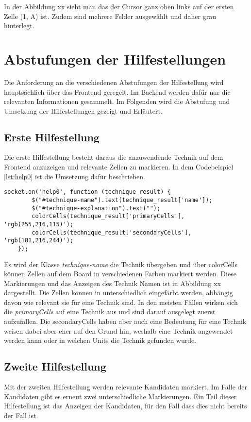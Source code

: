 In der Abbildung xx sieht man das der Cursor ganz oben links auf der ersten Zelle (1, A) ist. Zudem sind mehrere Felder ausgewählt und daher grau hinterlegt.



\section{Abstufungen der Hilfestellungen}
Die Anforderung an die verschiedenen Abstufungen der Hilfestellung wird hauptsächlich über das Frontend geregelt. Im Backend werden dafür nur die relevanten Informationen gesammelt. Im Folgenden wird die Abstufung und Umsetzung der Hilfestellungen gezeigt und Erläutert.

\subsection{Erste Hilfestellung}

Die erste Hilfestellung besteht daraus die anzuwendende Technik auf dem Frontend anzuzeigen und relevante Zellen zu markieren.  In dem Codebeispiel \ref{lst:help0} ist die Umsetzung dafür beschrieben.

\begin{lstlisting}[caption={Erste Hilfestellung}, label={lst:help0}]
	socket.on('help0', function (technique_result) {
		$("#technique-name").text(technique_result['name']);
		$("#technique-explanation").text("");
		colorCells(technique_result['primaryCells'], 'rgb(255,216,115)');
		colorCells(technique_result['secondaryCells'], 'rgb(181,216,244)');
	});
\end{lstlisting}

Es wird der Klasse \textit{technique-name} die Technik übergeben und über colorCells können Zellen auf dem Board in verschiedenen Farben markiert werden. Diese Markierungen und das Anzeigen des Technik Namen ist in Abbildung xx dargestellt. Die Zellen können in unterschiedlich eingefärbt werden, abhängig davon wie relevant sie für eine Technik sind. In den meisten Fällen wirken sich die \textit{primaryCells} auf eine Technik aus und sind darauf ausgelegt zuerst aufzufallen. Die secondaryCells haben aber auch eine Bedeutung für eine Technik weisen dabei aber eher auf den Grund hin, weshalb eine Technik angewendet werden kann oder in welchen Units die Technik gefunden wurde.


\subsection{Zweite Hilfestellung}
Mit der zweiten Hilfestellung werden relevante Kandidaten markiert. Im Falle der Kandidaten gibt es erneut zwei unterschiedliche Markierungen. Ein Teil dieser Hilfestellung ist das Anzeigen der Kandidaten, für den Fall dass dies nicht bereits der Fall ist. 

